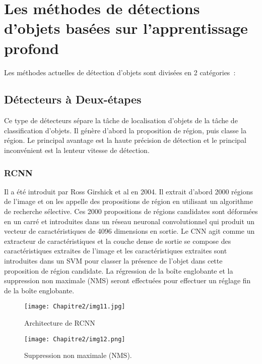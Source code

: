 \section{Les méthodes de détections d'objets basées sur l'apprentissage profond} 
Les méthodes actuelles de détection d'objets sont divisées en 2 catégories :
     \subsection{Détecteurs à Deux-étapes}
     Ce type de détecteurs sépare la tâche de localisation d'objets de la tâche de classification d'objets. Il génère d'abord la proposition de région, puis classe la région. Le principal avantage est la haute précision de détection et le principal inconvénient est la lenteur vitesse de détection.
     
     \subsubsection{RCNN} \cite{rcnn_paper}
     Il a été introduit par Ross Girshick et al en 2004. Il extrait d'abord 2000 régions de l'image et on les appelle des propositions de région en utilisant un algorithme de recherche sélective. Ces 2000 propositions de régions candidates sont déformées en un carré et introduites dans un réseau neuronal convolutionnel qui produit un vecteur de caractéristiques de 4096 dimensions en sortie. Le CNN agit comme un extracteur de caractéristiques et la couche dense de sortie se compose des caractéristiques extraites de l'image et les caractéristiques extraites sont introduites dans un SVM pour classer la présence de l'objet dans cette proposition de région candidate. La régression de la boîte englobante et la suppression non maximale (NMS) seront effectuées pour effectuer un réglage fin de la boîte englobante.
     \begin{figure}[H]
          \centering
          \texttt{[image: Chapitre2/img11.jpg]}
          \caption{Architecture de RCNN}
          \label{img11}
          \end{figure}
     \begin{figure}[H]
          \centering
          \texttt{[image: Chapitre2/img12.png]}
          \caption{Suppression non maximale (NMS).}
          \label{img12}
          \end{figure}

